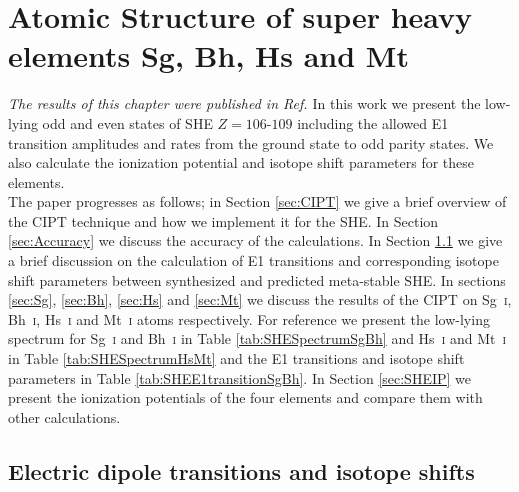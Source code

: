 \documentclass[10pt,a4paper, twoside]{report}
\begin{document}
\chapter{Atomic Structure of super heavy elements Sg, Bh, Hs and Mt} \label{chap:106}
\textit{The results of this chapter were published in Ref. \cite{LDFSg2018}}
In this work we present the low-lying odd and even states of SHE $Z=106$-$109$ including the allowed E1 transition amplitudes and rates from the ground state to odd parity states. We also calculate the ionization potential and isotope shift parameters for these elements.\\

The paper progresses as follows; in Section \ref{sec:CIPT} we give a brief overview of the CIPT technique and how we implement it for the SHE. In Section \ref{sec:Accuracy} we discuss the accuracy of the calculations. In Section \ref{sec:Isoshift} we give a brief discussion on the calculation of E1 transitions and corresponding isotope shift parameters between synthesized and predicted meta-stable SHE. In sections  \ref{sec:Sg}, \ref{sec:Bh}, \ref{sec:Hs} and \ref{sec:Mt} we discuss the results of the CIPT on  Sg~\textsc{i}, Bh~\textsc{i}, Hs~\textsc{i} and Mt~\textsc{i} atoms respectively.  For reference we present the low-lying spectrum for Sg~\textsc{i} and Bh~\textsc{i} in Table \ref{tab:SHESpectrumSgBh} and Hs~\textsc{i} and Mt~\textsc{i} in Table \ref{tab:SHESpectrumHsMt}  and the E1 transitions and isotope shift parameters in  Table \ref{tab:SHEE1transitionSgBh}. In Section \ref{sec:SHEIP} we present the ionization potentials of the four elements and compare them with other calculations. 


\section{Electric dipole transitions and isotope shifts} \label{sec:Isoshift}
\end{document}
